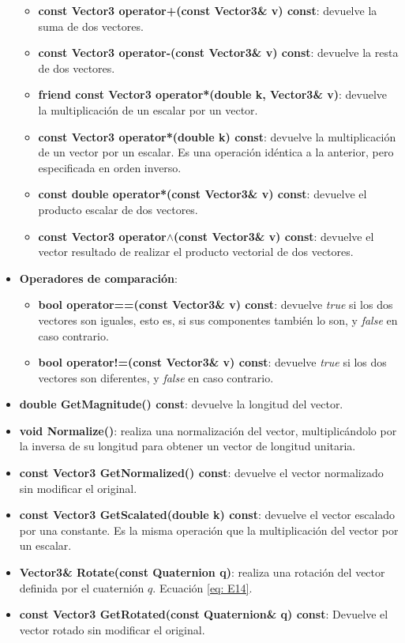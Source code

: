 \documentclass[12pt, a4paper]{report}
\begin{document}
\begin{itemize}
\begin{itemize}
\item \textbf{const Vector3 operator+(const Vector3\& v) const}: devuelve la suma de dos vectores.
\item \textbf{const Vector3 operator-(const Vector3\& v) const}: devuelve la resta de dos vectores.
\item \textbf{friend const Vector3 operator*(double k, Vector3\& v)}: devuelve la multiplicación de un escalar por un vector.
\item \textbf{const Vector3 operator*(double k) const}: devuelve la multiplicación de un vector por un escalar. Es una operación idéntica a la anterior, pero especificada en orden inverso.
\item \textbf{const double operator*(const Vector3\& v) const}: devuelve el producto escalar de dos vectores.
\item \textbf{const Vector3 operator$\wedge$(const Vector3\& v) const}: devuelve el vector resultado de realizar el producto vectorial de dos vectores.
\end{itemize}

\item \textbf{Operadores de comparación}:

\begin{itemize}
\item \textbf{bool operator==(const Vector3\& v) const}: devuelve \textit{true} si los dos vectores son iguales, esto es, si sus componentes también lo son, y \textit{false} en caso contrario.
\item \textbf{bool operator!=(const Vector3\& v) const}: devuelve \textit{true} si los dos vectores son diferentes, y \textit{false} en caso contrario.
\end{itemize}

\item \textbf{double GetMagnitude() const}: devuelve la longitud del vector.
\item \textbf{void Normalize()}: realiza una normalización del vector, multiplicándolo por la inversa de su longitud para obtener un vector de longitud unitaria.
\item \textbf{const Vector3 GetNormalized() const}: devuelve el vector normalizado sin modificar el original.
\item \textbf{const Vector3 GetScalated(double k) const}: devuelve el vector escalado por una constante. Es la misma operación que la multiplicación del vector por un escalar.
\item \textbf{Vector3\& Rotate(const Quaternion q)}: realiza una rotación del vector definida por el cuaternión $q$. Ecuación \eqref{eq: E14}.
\item \textbf{const Vector3 GetRotated(const Quaternion\& q) const}: Devuelve el vector rotado sin modificar el original.

\end{itemize}
\end{document}
